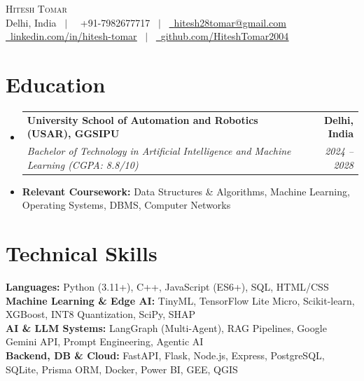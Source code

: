 \documentclass[letterpaper,10.5pt]{article}
\makeatletter
\newcommand{\resumeSubheading}[4]{
  \vspace{-1pt}\item
    \begin{tabular*}{1.0\textwidth}[t]{l@{\extracolsep{\fill}}r}
      \textbf{#1} & \textbf{\small #2} \\
      \textit{\small#3} & \textit{\small #4} \\
    \end{tabular*}\vspace{-5pt}
}
\newcommand{\resumeSubHeadingListStart}{\begin{itemize}[leftmargin=0.0in, label={}, itemsep=0pt, topsep=1pt]}
\newcommand{\resumeSubHeadingListEnd}{\end{itemize}\vspace{-3pt}}
\makeatother
\begin{document}
\begin{center}
    {\Huge \scshape Hitesh Tomar} \\ \vspace{2pt}
    \small Delhi, India ~$\vert$~ 
    \raisebox{-0.1\height}\faPhone\ +91-7982677717 ~$\vert$~
    \href{mailto:hitesh28tomar@gmail.com}{\raisebox{-0.2\height}\faEnvelope\ \underline{hitesh28tomar@gmail.com}} \\ \vspace{2pt}
    \href{https://www.linkedin.com/in/hitesh-tomar-b31059344/}{\raisebox{-0.2\height}\faLinkedin\ \underline{linkedin.com/in/hitesh-tomar}} ~$\vert$~
    \href{https://github.com/HiteshTomar2004}{\raisebox{-0.2\height}\faGithub\ \underline{github.com/HiteshTomar2004}}
    \vspace{-4pt}
\end{center}

\section{Education}
\resumeSubHeadingListStart
  \resumeSubheading
    {University School of Automation and Robotics (USAR), GGSIPU}{Delhi, India}
    {Bachelor of Technology in Artificial Intelligence and Machine Learning (CGPA: 8.8/10)}{2024 -- 2028}
    \vspace{-3pt}
    \item \small{\textbf{Relevant Coursework:} Data Structures \& Algorithms, Machine Learning, Operating Systems, DBMS, Computer Networks}
\resumeSubHeadingListEnd

\section{Technical Skills}
\begin{itemize}[leftmargin=0.15in, label={}, itemsep=2pt, parsep=0pt, topsep=1pt]
    \small{\item{
     \textbf{Languages:} Python (3.11+), C++, JavaScript (ES6+), SQL, HTML/CSS \\
     \textbf{Machine Learning \& Edge AI:} TinyML, TensorFlow Lite Micro, Scikit-learn, XGBoost, INT8 Quantization, SciPy, SHAP \\
     \textbf{AI \& LLM Systems:} LangGraph (Multi-Agent), RAG Pipelines, Google Gemini API, Prompt Engineering, Agentic AI \\
     \textbf{Backend, DB \& Cloud:} FastAPI, Flask, Node.js, Express, PostgreSQL, SQLite, Prisma ORM, Docker, Power BI, GEE, QGIS
    }}
\end{itemize}
\vspace{-3pt}
\end{document}
